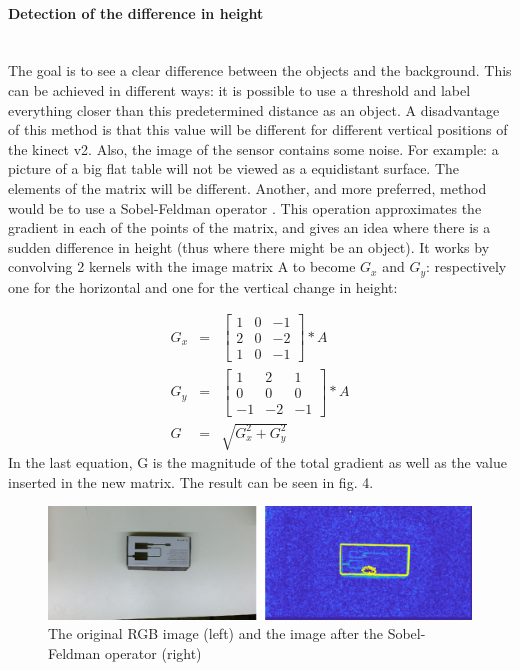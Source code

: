 \documentclass[11pt]{article}
\begin{document}
\paragraph{Detection of the difference in height}\mbox{}\\
The goal is to see a clear difference between the objects and the background. This can be achieved in different ways: it is possible to use a threshold and label everything closer than this predetermined distance as an object. A disadvantage of this method is that this value will be different for different vertical positions of the kinect v2. Also, the image of the sensor contains some noise. For example: a picture of a big flat table will not be viewed as a equidistant surface. The elements of the matrix will be different. Another, and more preferred, method would be to use a Sobel-Feldman operator \cite{Sobel_operator}. This operation approximates the gradient in each of the points of the matrix, and gives an idea where there is a sudden difference in height (thus where there might be an object). It works by convolving 2 kernels with the image matrix A to become $G_{x}$ and $G_{y}$: respectively one for the horizontal and one for the vertical change in height: 

\begin{eqnarray*}
G_{x} &=& 
	\begin{bmatrix}
		1&0&-1\\
		2&0&-2\\
		1&0&-1
	\end{bmatrix}
	*A \\
G_{y} &=& 
	\begin{bmatrix}
		1&2&1\\
		0&0&0\\
		-1&-2&-1
	\end{bmatrix}
	*A\\
G &=& \sqrt{G_{x}^2+G_{y}^2}
\end{eqnarray*}
In the last equation, G is the magnitude of the total gradient as well as the value inserted in the new matrix.
The result can be seen in fig. 4.
\begin{figure}[h]
	\center
  \includegraphics[width=1\linewidth]{original_and_sobel.png}
  \caption{The original RGB image (left) and the image after the Sobel-Feldman operator (right)}
  \label{fig:Moore_Neighbor}
\end{figure}
\end{document}
